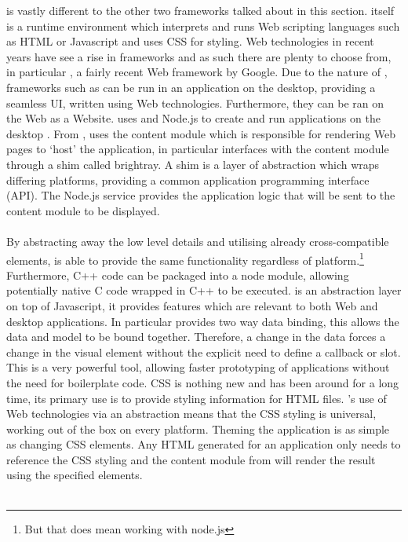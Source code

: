  is vastly different to the other two frameworks talked about in this section.  itself is a runtime environment which interprets and runs Web scripting languages such as HTML or Javascript and uses CSS for styling\cite{electron}. Web technologies in recent years have see a rise in frameworks and as such there are plenty to choose from, in particular , a fairly recent Web framework by Google. Due to the nature of , frameworks such as  can be run in an application on the desktop, providing a seamless UI, written using Web technologies. Furthermore, they can be ran on the Web as a Website.
%
   uses  and Node.js to create and run applications on the desktop \cite{electron_about}. From ,  uses the content module which is responsible for rendering Web pages to `host' the application, in particular  interfaces with the content module through a shim called brightray\cite{electron_content_module}. A shim is a layer of abstraction which wraps differing platforms, providing a common application programming interface (API). The Node.js service provides the application logic that will be sent to the content module to be displayed.\\\\
  By abstracting away the low level details and utilising already cross-compatible elements,  is able to provide the same functionality regardless of platform.\footnote{But that does mean working with node.js} Furthermore, C++ code can be packaged into a node module, allowing potentially native C code wrapped in C++ to be executed.
   is an abstraction layer on top of Javascript, it provides features which are relevant to both Web and desktop applications\cite{angular}. In particular  provides two way data binding, this allows the data and model to be bound together\cite{angular_data_binding}. Therefore, a change in the data forces a change in the visual element without the explicit need to define a callback or slot. This is a very powerful tool, allowing faster prototyping of applications without the need for boilerplate code.
  CSS is nothing new and has been around for a long time, its primary use is to provide styling information for HTML files. 's use of Web technologies via an abstraction means that the CSS styling is universal, working out of the box on every platform. Theming the application is as simple as changing CSS elements. Any HTML generated for an application only needs to reference the CSS styling and the content module from  will render the result using the specified elements.\\\\
